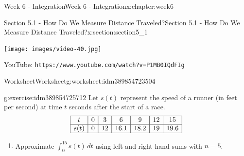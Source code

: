 \documentclass[oneside,10pt,]{book}
\newcommand{\mono}[1]{\texttt{#1}}
\numberwithin{equation}{section}
\newlength{\qrsize}
\newlength{\previewwidth}
\newcommand{\amp}{&}
\begin{document}
\begin{chapterptx}{Week 6 - Integration}{}{Week 6 - Integration}{}{}{x:chapter:week6}
%
%
\typeout{************************************************}
\typeout{************************************************}
%
\begin{sectionptx}{Section 5.1 - How Do We Measure Distance Traveled?}{}{Section 5.1 - How Do We Measure Distance Traveled?}{}{}{x:section:section5_1}
\setlength{\qrsize}{9em}
\setlength{\previewwidth}{\linewidth}
\addtolength{\previewwidth}{-\qrsize}
\begin{tcbraster}[raster columns=2, raster column skip=1pt, raster halign=center, raster force size=false, raster left skip=0pt, raster right skip=0pt]%
\begin{tcolorbox}[previewstyle, width=\previewwidth]%
\texttt{[image: images/video-40.jpg]}%
\end{tcolorbox}%
\begin{tcolorbox}[qrstyle]%
{\hypersetup{urlcolor=black}}%
\end{tcolorbox}%
\begin{tcolorbox}[captionstyle]%
\small YouTube: \mono{https://www.youtube.com/watch?v=P1MB0IQdFIg}\end{tcolorbox}%
\end{tcbraster}%
%
%
\typeout{************************************************}
\typeout{************************************************}
%
\begin{worksheet-subsection}{Worksheet}{}{Worksheet}{}{}{g:worksheet:idm389854723504}
\begin{divisionexercise}{1}{}{}{g:exercise:idm389854725712}%
Let \(s(t)\) represent the speed of a runner (in feet per second) at time \(t\) seconds after the start of a race.%
\begin{equation*}
\begin{array} {| c | c | c | c | c | c | c |}
\hline t \amp 0 \amp 3 \amp 6 \amp 9 \amp 12 \amp 15 \\
\hline s(t) \amp 0 \amp 12 \amp 16.1 \amp 18.2 \amp 19 \amp 19.6 \\
\hline
\end{array}
\end{equation*}
%
%
\begin{enumerate}[label=(\alph*)]
\item{}Approximate \(\displaystyle{\int_0^{15} s(t) \,dt}\) using left and right hand sums with \(n=5\).%

\end{enumerate}
\end{divisionexercise}
\end{worksheet-subsection}
\end{sectionptx}
\end{chapterptx}
\end{document}
